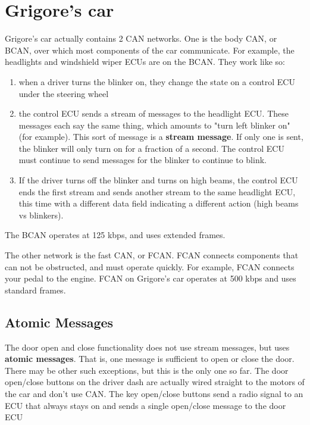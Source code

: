 \documentclass[12pt]{article}
\begin{document}
\section{Grigore's car}
Grigore's car actually contains 2 CAN networks. One is the body CAN, or BCAN,
over which most components of the car communicate. For example, the headlights
and windshield wiper ECUs are on the BCAN. They work like so:
\begin{enumerate}
\item when a driver turns the blinker on, they change the state on a control
   ECU under the steering wheel
\item the control ECU sends a stream of messages to the headlight ECU. These 
   messages each say the same thing, which amounts to "turn left blinker on" 
   (for example). This sort of message is a \textbf{stream message}. If only one is
   sent, the blinker will only turn on for a fraction of a second. The control
   ECU must continue to send messages for the blinker to continue to blink.
\item If the driver turns off the blinker and turns on high beams, the control ECU
   ends the first stream and
   sends another stream to the same headlight ECU, this time with a different
   data field indicating a different action (high beams vs blinkers).
\end{enumerate}
The BCAN operates at 125 kbps, and uses extended frames.

The other network is the fast CAN, or FCAN. FCAN connects components that can
not be obstructed, and must operate quickly. For example, FCAN connects your
pedal to the engine. FCAN on Grigore's car operates at 500 kbps and uses
standard frames. 

\subsection{Atomic Messages}
The door open and close functionality does not use stream messages, but uses
\textbf{atomic messages}. That is, one message is sufficient to open or close the
door. There may be other such exceptions, but this is the only one so far.
The door open/close buttons on the driver dash are actually wired straight to
the motors of the car and don't use CAN. The key open/close buttons send
a radio signal to an ECU that always stays on and sends a single open/close
message to the door ECU
\end{document}
